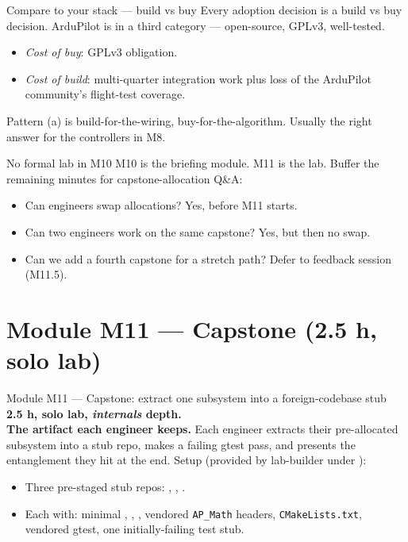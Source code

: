 \documentclass[aspectratio=169,11pt]{beamer}
\begin{document}
\begin{frame}{Compare to your stack --- build vs buy}
  Every adoption decision is a build vs buy decision.
  \vfill
  ArduPilot is in a third category --- open-source, GPLv3, well-tested.
  \vfill
  \begin{itemize}
    \item \emph{Cost of buy}: GPLv3 obligation.
    \item \emph{Cost of build}: multi-quarter integration work plus loss of the ArduPilot community's flight-test coverage.
  \end{itemize}
  \vfill
  Pattern (a) is build-for-the-wiring, buy-for-the-algorithm. Usually the right answer for the controllers in M8.
\end{frame}

\begin{frame}[allowframebreaks]{No formal lab in M10}
  M10 is the briefing module. M11 is the lab.
  \vfill
  Buffer the remaining minutes for capstone-allocation Q\&A:
  \begin{itemize}
    \item Can engineers swap allocations? Yes, before M11 starts.
    \item Can two engineers work on the same capstone? Yes, but then no swap.
    \item Can we add a fourth capstone for a stretch path? Defer to feedback session (M11.5).
  \end{itemize}
\end{frame}

\section{Module M11 --- Capstone (2.5 h, solo lab)}

\begin{frame}{Module M11 --- Capstone: extract one subsystem into a foreign-codebase stub}
  \textbf{2.5 h, solo lab, \emph{internals} depth.}\\[1ex]
  \textbf{The artifact each engineer keeps.}
  \vfill
  Each engineer extracts their pre-allocated subsystem into a stub repo, makes a failing gtest pass, and presents the entanglement they hit at the end.
  \vfill
  Setup (provided by lab-builder under ):
  \begin{itemize}
    \item Three pre-staged stub repos: , , .
    \item Each with: minimal , , , vendored \texttt{AP\_Math} headers, \texttt{CMakeLists.txt}, vendored gtest, one initially-failing test stub.
  \end{itemize}
\end{frame}
\end{document}
